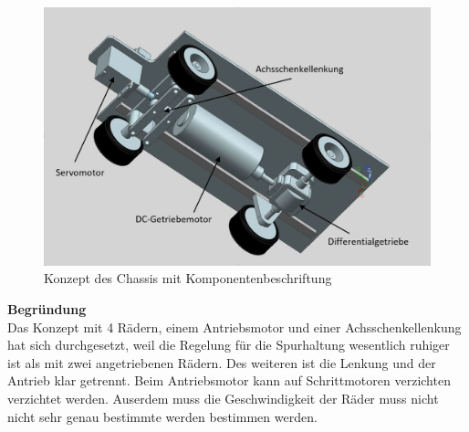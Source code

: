 \begin{figure}[H]%
\centering
\includegraphics[width=1\textwidth]{03_Loesungskonzept/pictures/Chassis_1.JPG}
\caption{Konzept des Chassis mit Komponentenbeschriftung}
\label{fig:activityRoute}
\end{figure}\flushleft
\textbf{Begründung}
\\[0.2cm]
Das Konzept mit 4 Rädern, einem Antriebsmotor und einer Achsschenkellenkung hat sich durchgesetzt, weil die Regelung für die Spurhaltung wesentlich ruhiger ist als mit zwei angetriebenen Rädern. Des weiteren ist die Lenkung und der Antrieb klar getrennt. Beim Antriebsmotor kann auf Schrittmotoren verzichten verzichtet werden. Auserdem muss die Geschwindigkeit der Räder muss nicht nicht sehr genau bestimmte werden bestimmen werden.
